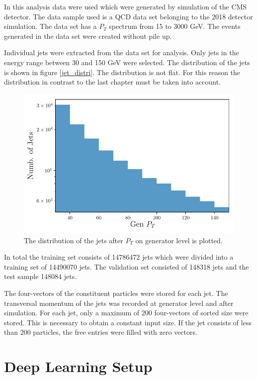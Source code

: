 \documentclass[12pt, a4paper]{thesis}
\begin{document}
In this analysis data were used which were generated by simulation of
the CMS detector. The data sample used is a QCD data set belonging to
the 2018 detector simulation. The data set has a \(P_T\) spectrum from
15 to 3000 GeV. The events generated in the data set were created
without pile up.

Individual jets were extracted from the data set for analysis. Only
jets in the energy range between 30 and 150 GeV were selected. The
distribution of the jets is shown in figure \ref{jet_distri}. The
distribution is not flat.  For this reason the distribution in
contrast to the last chapter must be taken into account.

\begin{figure}[htbp]
\centering
\includegraphics[width=.9\linewidth]{../images/jet_distri.pdf}
\caption{\label{fig:orga8fe027}
The distribution of the jets after \(P_T\) on generator level is plotted.}
\end{figure}

In total the training set consists of 14786472 jets which were divided
into a training set of 14490070 jets. The validation set consisted of
148318 jets and the test sample 148084 jets.

The four-vectors of the constituent particles were stored for each
jet. The transversal momentum of the jets was recorded at generator
level and after simulation. For each jet, only a maximum of 200
four-vectors of sorted size were stored. This is necessary to obtain a
constant input size. If the jet consists of less than 200 particles,
the free entries were filled with zero vectors.

\section{Deep Learning Setup}
\label{sec:orgf3b24cc}
\end{document}
